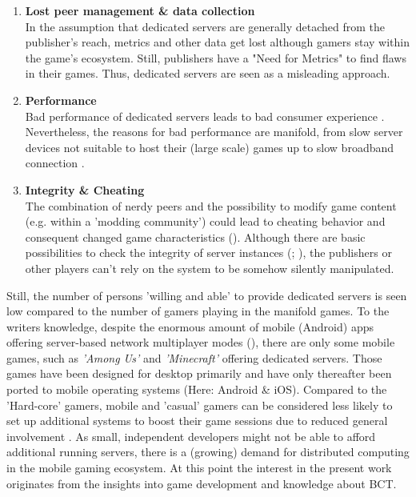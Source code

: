 \begin{enumerate}
	\item \textbf{Lost peer management \& data collection} \\
	In the assumption that dedicated servers are generally detached from the publisher's reach,
	metrics and other data get lost although gamers stay within the game's ecosystem.
	Still, publishers have a "Need for Metrics" \cite[152]{Palmer.2002} to find flaws in their games.
	Thus, dedicated servers are seen as a misleading approach.
	
	\item \textbf{Performance} \\
	Bad performance of dedicated servers leads to bad consumer experience \cite[10]{Weilbacher.2012}.
	Nevertheless, the reasons for bad performance are manifold, from slow server devices not suitable to host their
	(large scale) games up to slow broadband connection \cite[10]{Weilbacher.2012}.
	
	\item \textbf{Integrity \& Cheating} \\
	The combination of nerdy peers and the possibility to modify game content (e.g. within a 'modding community')
	could lead to cheating behavior and consequent changed game characteristics (\cite{Morris.2003}).
	Although there are basic possibilities to check the integrity of server instances (\cite{Agosta.2003}; \cite{Deswarte.2004}),
	the publishers or other players can't rely on the system to be somehow silently manipulated.
	
\end{enumerate}
Still, the number of persons 'willing and able' to provide dedicated servers is seen low compared to the number of gamers playing in the manifold games.
To the writers knowledge, despite the enormous amount of mobile (Android) apps offering server-based network multiplayer
modes (\cite{itch.io.2021}),
there are only some mobile games, such as \textit{'Among Us'} and \textit{'Minecraft'} offering dedicated servers.
Those games have been designed for desktop primarily and have only thereafter been ported to mobile operating systems (Here: Android \& iOS).
Compared to the 'Hard-core' gamers, mobile and 'casual' gamers can be considered less likely to set up additional systems
to boost their game sessions due to reduced general involvement \cite[388]{Prugsamatz.2010}.
As small, independent developers might not be able to afford additional running servers,
there is a (growing) demand for distributed computing in the mobile gaming ecosystem.
At this point the interest in the present work originates from the insights into game development and knowledge about \gls{BCT}.
